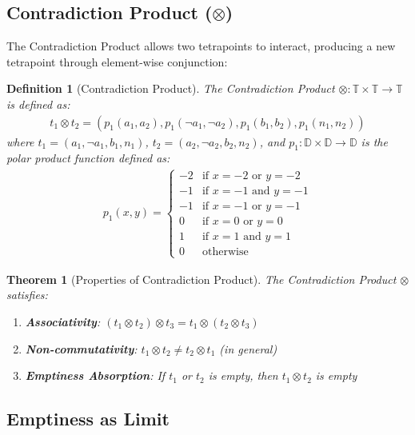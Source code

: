 \documentclass[11pt,a4paper]{article}
\newtheorem{definition}{Definition}
\newtheorem{theorem}{Theorem}
\begin{document}
\subsection{Contradiction Product ($\otimes$)}

The Contradiction Product allows two tetrapoints to interact, producing a new tetrapoint through element-wise conjunction:

\begin{definition}[Contradiction Product]
The Contradiction Product $\otimes: \mathbb{T} \times \mathbb{T} \rightarrow \mathbb{T}$ is defined as:
\begin{align}
t_1 \otimes t_2 = (p_1(a_1, a_2), p_1(\neg a_1, \neg a_2), p_1(b_1, b_2), p_1(n_1, n_2))
\end{align}
where $t_1 = (a_1, \neg a_1, b_1, n_1)$, $t_2 = (a_2, \neg a_2, b_2, n_2)$, and $p_1: \mathbb{D} \times \mathbb{D} \rightarrow \mathbb{D}$ is the polar product function defined as:
\begin{align}
p_1(x, y) = \begin{cases}
-2 & \text{if } x = -2 \text{ or } y = -2 \\
-1 & \text{if } x = -1 \text{ and } y = -1 \\
-1 & \text{if } x = -1 \text{ or } y = -1 \\
0 & \text{if } x = 0 \text{ or } y = 0 \\
1 & \text{if } x = 1 \text{ and } y = 1 \\
0 & \text{otherwise}
\end{cases}
\end{align}
\end{definition}

\begin{theorem}[Properties of Contradiction Product]
The Contradiction Product $\otimes$ satisfies:
\begin{enumerate}
    \item \textbf{Associativity}: $(t_1 \otimes t_2) \otimes t_3 = t_1 \otimes (t_2 \otimes t_3)$
    \item \textbf{Non-commutativity}: $t_1 \otimes t_2 \neq t_2 \otimes t_1$ (in general)
    \item \textbf{Emptiness Absorption}: If $t_1$ or $t_2$ is empty, then $t_1 \otimes t_2$ is empty
\end{enumerate}
\end{theorem}

\subsection{Emptiness as Limit}
\end{document}
